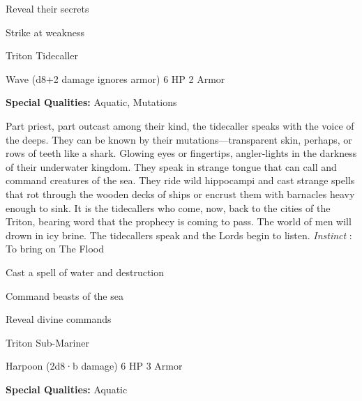 \startitemize[1,packed]
         
\item Reveal their secrets

         
\item Strike at weakness

       
\stopitemize
       
\startMonsterName
Triton Tidecaller	 
\stopMonsterName
       

Wave (d8+2 damage ignores armor)	6 HP	2 Armor

       


       
\startMonsterQualities
         {\bf Special Qualities:}  Aquatic, Mutations
\stopMonsterQualities
       
\startMonsterDescription
Part priest, part outcast among their kind, the tidecaller speaks with the voice of the deeps. They can be known by their mutations—transparent skin, perhaps, or rows of teeth like a shark. Glowing eyes or fingertips, angler-lights in the darkness of their underwater kingdom. They speak in strange tongue that can call and command creatures of the sea. They ride wild hippocampi and cast strange spells that rot through the wooden decks of ships or encrust them with barnacles heavy enough to sink. It is the tidecallers who come, now, back to the cities of the Triton, bearing word that the prophecy is coming to pass. The world of men will drown in icy brine. The tidecallers speak and the Lords begin to listen. {\em Instinct} : To bring on The Flood
\stopMonsterDescription
       
\startitemize[1,packed]
         
\item Cast a spell of water and destruction

         
\item Command beasts of the sea

         
\item Reveal divine commands

       
\stopitemize
       
\startMonsterName
Triton Sub-Mariner	 
\stopMonsterName
       

Harpoon (2d8·b damage)	6 HP	3 Armor

       


       
\startMonsterQualities
         {\bf Special Qualities:}  Aquatic
\stopMonsterQualities
       
